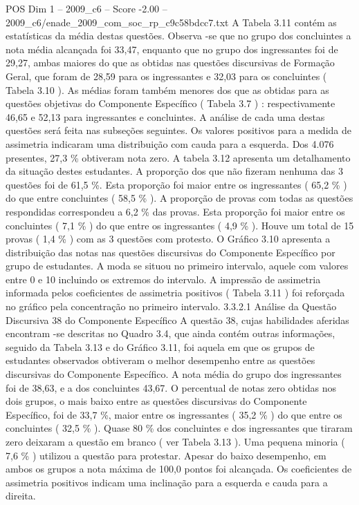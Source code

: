 \begin{textsample}{POS Dim 1 – 2009\_c6 – Score -2.00 – 2009\_c6/enade\_2009\_com\_soc\_rp\_c9c58bdcc7.txt}
A Tabela 3.11 contém as estatísticas da média destas questões.
Observa -se que no grupo dos concluintes a nota média alcançada foi 33,47, enquanto que no grupo dos ingressantes foi de 29,27, ambas maiores do que as obtidas nas questões discursivas de Formação Geral, que foram de 28,59 para os ingressantes e 32,03 para os concluintes ( Tabela 3.10 ).
As médias foram também menores dos que as obtidas para as questões objetivas do Componente Específico ( Tabela 3.7 ) : respectivamente 46,65 e 52,13 para ingressantes e concluintes.
A análise de cada uma destas questões será feita nas subseções seguintes.
Os valores positivos para a medida de assimetria indicaram uma distribuição com cauda para a esquerda.
Dos 4.076 presentes, 27,3 \% obtiveram nota zero.
A tabela 3.12 apresenta um detalhamento da situação destes estudantes.
A proporção dos que não fizeram nenhuma das 3 questões foi de 61,5 \%.
Esta proporção foi maior entre os ingressantes ( 65,2 \% ) do que entre concluintes ( 58,5 \% ).
A proporção de provas com todas as questões respondidas correspondeu a 6,2 \% das provas.
Esta proporção foi maior entre os concluintes ( 7,1 \% ) do que entre os ingressantes ( 4,9 \% ).
Houve um total de 15 provas ( 1,4 \% ) com as 3 questões com protesto.
O Gráfico 3.10 apresenta a distribuição das notas nas questões discursivas do Componente Específico por grupo de estudantes.
A moda se situou no primeiro intervalo, aquele com valores entre 0 e 10 incluindo os extremos do intervalo.
A impressão de assimetria informada pelos coeficientes de assimetria positivos ( Tabela 3.11 ) foi reforçada no gráfico pela concentração no primeiro intervalo. 3.3.2.1 Análise da Questão Discursiva 38 do Componente Específico A questão 38, cujas habilidades aferidas encontram -se descritas no Quadro 3.4, que ainda contém outras informações, seguido da Tabela 3.13 e do Gráfico 3.11, foi aquela em que os grupos de estudantes observados obtiveram o melhor desempenho entre as questões discursivas do Componente Específico.
A nota média do grupo dos ingressantes foi de 38,63, e a dos concluintes 43,67.
O percentual de notas zero obtidas nos dois grupos, o mais baixo entre as questões discursivas do Componente Específico, foi de 33,7 \%, maior entre os ingressantes ( 35,2 \% ) do que entre os concluintes ( 32,5 \% ).
Quase 80 \% dos concluintes e dos ingressantes que tiraram zero deixaram a questão em branco ( ver Tabela 3.13 ).
Uma pequena minoria ( 7,6 \% ) utilizou a questão para protestar.
Apesar do baixo desempenho, em ambos os grupos a nota máxima de 100,0 pontos foi alcançada.
Os coeficientes de assimetria positivos indicam uma inclinação para a esquerda e cauda para a direita.

\end{textsample}
